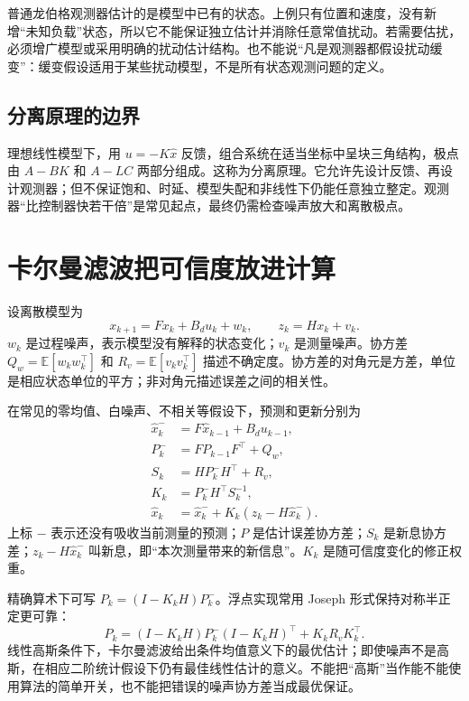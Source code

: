 普通龙伯格观测器估计的是模型中已有的状态。上例只有位置和速度，没有新增“未知负载”状态，所以它不能保证独立估计并消除任意常值扰动。若需要估扰，必须增广模型或采用明确的扰动估计结构。也不能说“凡是观测器都假设扰动缓变”：缓变假设适用于某些扰动模型，不是所有状态观测问题的定义。

\subsection{分离原理的边界}

理想线性模型下，用 $u=-K\hat x$ 反馈，组合系统在适当坐标中呈块三角结构，极点由 $A-BK$ 和 $A-LC$ 两部分组成。这称为分离原理。它允许先设计反馈、再设计观测器；但不保证饱和、时延、模型失配和非线性下仍能任意独立整定。观测器“比控制器快若干倍”是常见起点，最终仍需检查噪声放大和离散极点。

\section{卡尔曼滤波把可信度放进计算}

设离散模型为
\[
x_{k+1}=F x_k+B_du_k+w_k,\qquad z_k=Hx_k+v_k.
\]
$w_k$ 是过程噪声，表示模型没有解释的状态变化；$v_k$ 是测量噪声。协方差 $Q_w=\mathbb E[w_kw_k^\top]$ 和 $R_v=\mathbb E[v_kv_k^\top]$ 描述不确定度。协方差的对角元是方差，单位是相应状态单位的平方；非对角元描述误差之间的相关性。

在常见的零均值、白噪声、不相关等假设下，预测和更新分别为
\begin{align}
\hat x_k^-&=F\hat x_{k-1}+B_du_{k-1},\\
P_k^-&=FP_{k-1}F^\top+Q_w,\\
S_k&=HP_k^-H^\top+R_v,\\
K_k&=P_k^-H^\top S_k^{-1},\\
\hat x_k&=\hat x_k^-+K_k(z_k-H\hat x_k^-).
\label{eq:cf_kalman}
\end{align}
上标 $-$ 表示还没有吸收当前测量的预测；$P$ 是估计误差协方差；$S_k$ 是新息协方差；$z_k-H\hat x_k^-$ 叫新息，即“本次测量带来的新信息”。$K_k$ 是随可信度变化的修正权重。

精确算术下可写 $P_k=(I-K_kH)P_k^-$。浮点实现常用 Joseph 形式保持对称半正定更可靠：
\begin{equation}
P_k=(I-K_kH)P_k^-(I-K_kH)^\top+K_kR_vK_k^\top.
\end{equation}
线性高斯条件下，卡尔曼滤波给出条件均值意义下的最优估计；即使噪声不是高斯，在相应二阶统计假设下仍有最佳线性估计的意义。不能把“高斯”当作能不能使用算法的简单开关，也不能把错误的噪声协方差当成最优保证。

